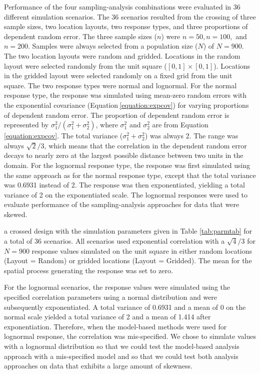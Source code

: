 \documentclass[]{elsarticle} %
\begin{document}
Performance of the four sampling-analysis combinations were evaluated in
36 different simulation scenarios. The 36 scenarios resulted from the
crossing of three sample sizes, two location layouts, two response
types, and three proportions of dependent random error. The three sample
sizes (\(n\)) were \(n = 50, n = 100,\) and \(n = 200\). Samples were
always selected from a population size (\(N\)) of \(N = 900\). The two
location layouts were random and gridded. Locations in the random layout
were selected randomly from the unit square (\([0, 1] \times [0, 1]\)).
Locations in the gridded layout were selected randomly on a fixed grid
from the unit square. The two response types were normal and lognormal.
For the normal response type, the response was simulated using mean-zero
random errors with the exponential covariance
(Equation\(~\)\ref{equation:expcov}) for varying proportions of
dependent random error. The proportion of dependent random error is
represented by \(\sigma^2_1 / (\sigma^2_1 + \sigma^2_2)\), where
\(\sigma^2_1\) and \(\sigma^2_2\) are from
Equation\(~\)\ref{equation:expcov}. The total variance
(\(\sigma^2_1 + \sigma^2_2\)) was always 2. The range was always
\(\sqrt{2} / 3\), which means that the correlation in the dependent
random error decays to nearly zero at the largest possible distance
between two units in the domain. For the lognormal response type, the
response was first simulated using the same approach as for the normal
response type, except that the total variance was 0.6931 instead of 2.
The response was then exponentiated, yielding a total variance of 2 on
the exponentiated scale. The lognormal responses were used to evaluate
performance of the sampling-analysis approaches for data that were
skewed.

a crossed design with the simulation parameters given in Table
\ref{tab:parmtab} for a total of 36 scenarios. All scenarios used
exponential correlation with a \(\sqrt{4} / 3\) for \(N = 900\) response
values simulated on the unit square in either random locations (Layout =
Random) or gridded locations (Layout = Gridded). The mean for the
spatial process generating the response was set to zero.

For the lognormal scenarios, the response values were simulated using
the specified correlation parameters using a normal distribution and
were subsequently exponentiated. A total variance of 0.6931 and a mean
of 0 on the normal scale yielded a total variance of 2 and a mean of
1.414 after exponentiation. Therefore, when the model-based methods were
used for lognormal response, the correlation was mis-specified. We chose
to simulate values with a lognormal distribution so that we could test
the model-based analysis approach with a mis-specified model and so that
we could test both analysis approaches on data that exhibits a large
amount of skewness.
\end{document}
